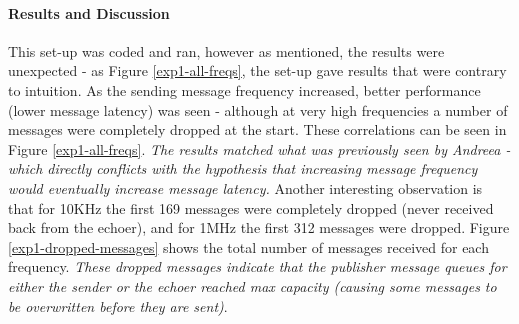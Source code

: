 \documentclass[../dissertation.tex]{subfiles}
\begin{document}


\paragraph{Results and Discussion} This set-up was coded and ran, however as mentioned, the results were unexpected - as Figure \ref{exp1-all-freqs}, the set-up gave results that were contrary to intuition. As the sending message frequency increased, better performance (lower message latency) was seen - although at very high frequencies a number of messages were completely dropped at the start. These correlations can be seen in Figure \ref{exp1-all-freqs}. \textit{The results matched what was previously seen by Andreea - which directly conflicts with the hypothesis that increasing message frequency would eventually increase message latency.} Another interesting observation is that for 10KHz the first 169 messages were completely dropped (never received back from the echoer), and for 1MHz the first 312 messages were dropped. Figure \ref{exp1-dropped-messages} shows the total number of messages received for each frequency. \textit{These dropped messages indicate that the publisher message queues for either the sender or the echoer reached max capacity (causing some messages to be overwritten before they are sent)}.
\end{document}
